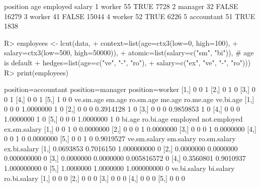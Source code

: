 \documentclass{article}\usepackage[]{graphicx}\usepackage[]{color}
\begin{document}
\begin{Schunk}
% --begin: "lcut.data.frame2"
\begin{Soutput}
    position age employed salary
1     worker  55     TRUE   7728
2    manager  32    FALSE  16279
3     worker  41    FALSE  15044
4     worker  52     TRUE   6226
5 accountant  51     TRUE   1838
\end{Soutput}
\begin{Sinput}
R> employees <- lcut(data,
+                    context=list(age=ctx3(low=0, high=100),
+                                 salary=ctx3(low=500, high=50000)),
+                    atomic=list(salary=c("sm", "bi")), # age is default
+                    hedges=list(age=c("ve", "-", "ro"),
+                                salary=c("ex", "ve", "-", "ro")))
R> print(employees)
\end{Sinput}
\begin{Soutput}
     position=accountant position=manager position=worker
[1,]                   0                0               1
[2,]                   0                1               0
[3,]                   0                0               1
[4,]                   0                0               1
[5,]                   1                0               0
     ve.sm.age sm.age ro.sm.age    me.age ro.me.age ve.bi.age
[1,]         0      0         0 1.0000000         1         0
[2,]         0      0         0 0.3914128         1         0
[3,]         0      0         0 0.9859853         1         0
[4,]         0      0         0 1.0000000         1         0
[5,]         0      0         0 1.0000000         1         0
     bi.age ro.bi.age employed not.employed ex.sm.salary
[1,]      0         0        1            0    0.0000000
[2,]      0         0        0            1    0.0000000
[3,]      0         0        0            1    0.0000000
[4,]      0         0        1            0    0.0000000
[5,]      0         0        1            0    0.9019527
     ve.sm.salary sm.salary ro.sm.salary ex.bi.salary
[1,]    0.0693853 0.7016150  1.000000000            0
[2,]    0.0000000 0.0000000  0.000000000            0
[3,]    0.0000000 0.0000000  0.005816572            0
[4,]    0.3560801 0.9010937  1.000000000            0
[5,]    1.0000000 1.0000000  1.000000000            0
     ve.bi.salary bi.salary ro.bi.salary
[1,]            0         0            0
[2,]            0         0            0
[3,]            0         0            0
[4,]            0         0            0
[5,]            0         0            0
\end{Soutput}
%
% --end: "lcut.data.frame2"
\end{Schunk}
\end{document}
